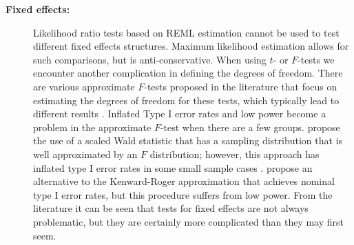 \documentclass[12pt]{article} %
\begin{document}
\begin{description}
\item[\bf Fixed effects: ] Likelihood ratio tests based on REML estimation cannot be used to test different fixed effects structures. Maximum likelihood estimation allows for such comparisons, but is anti-conservative. 
When using  $t$- or $F$-tests we encounter another  complication in defining the degrees of freedom. There are various approximate $F$-tests proposed in the literature that focus on estimating the degrees of freedom for these tests, which typically lead to different results \citep{Verbeke:2000fh}. Inflated Type I error rates and low power \citep{Catellier:2000vr}  become a problem  in the  approximate $F$-test when there are a few groups. \cite{Kenward:1997ft} propose the use of a scaled Wald statistic  that has a sampling distribution that is well approximated by an $F$ distribution; however, this approach has inflated type I error rates in some small sample cases  \citep{Gomez:2005dw}. \cite{Skene:2010kf} propose an alternative to the Kenward-Roger approximation that achieves nominal type I error rates, but this procedure suffers from low power. From the literature it can be seen that tests for fixed effects are not always problematic, but they are certainly more complicated than they may first seem.
%
%
%



\end{description}
\end{document}
